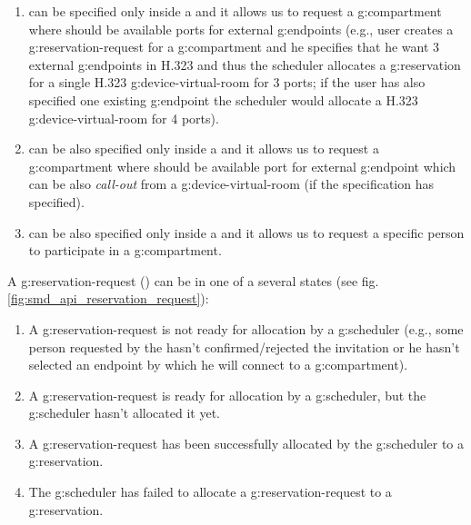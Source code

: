 \begin{enumerate}
\item {} can be specified only inside a  and it allows us to request a \gls{g:compartment} where should be available ports for external \glspl{g:endpoint} (e.g., user creates a \gls{g:reservation-request} for a \gls{g:compartment} and he specifies that he want 3 external \glspl{g:endpoint} in H.323 and thus the scheduler allocates a \gls{g:reservation} for a single H.323 \gls{g:device-virtual-room} for 3 ports; if the user has also specified one existing \gls{g:endpoint} the scheduler would allocate a H.323 \gls{g:device-virtual-room} for 4 ports).

\item {} can be also specified only inside a  and it allows us to request a \gls{g:compartment} where should be available port for external \gls{g:endpoint} which can be also \emph{call-out} from a \gls{g:device-virtual-room} (if the specification has  specified).

\item {} can be also specified only inside a  and it allows us to request a specific person to participate in a \gls{g:compartment}.

\end{enumerate}

A \gls{g:reservation-request} () can be in one of a several states (see fig. \ref{fig:smd_api_reservation_request}):
\begin{enumerate}
\item {} A \gls{g:reservation-request} is not ready for allocation by a \gls{g:scheduler} (e.g., some person requested by the  hasn't confirmed/rejected the invitation or he hasn't selected an endpoint by which he will connect to a \gls{g:compartment}).
\item {} A \gls{g:reservation-request} is ready for allocation by a \gls{g:scheduler}, but the \gls{g:scheduler} hasn't allocated it yet.
\item {} A \gls{g:reservation-request} has been successfully allocated by the \gls{g:scheduler} to a \gls{g:reservation}.
\item {} The \gls{g:scheduler} has failed to allocate a \gls{g:reservation-request} to a \gls{g:reservation}.
\end{enumerate}

